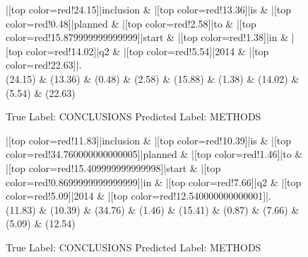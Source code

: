 \documentclass[a4paper, landscape]{article}
\begin{document}
\begin{figure}
\begin{center}
\begin{dependency}
\begin{deptext}
|[top color=red!24.15]|inclusion \& |[top color=red!13.36]|is \& |[top color=red!0.48]|planned \& |[top color=red!2.58]|to \& |[top color=red!15.879999999999999]|start \& |[top color=red!1.38]|in \& |[top color=red!14.02]|q2 \& |[top color=red!5.54]|2014 \& |[top color=red!22.63]|.\\
(24.15) \& (13.36) \& (0.48) \& (2.58) \& (15.88) \& (1.38) \& (14.02) \& (5.54) \& (22.63)\\
\end{deptext}
\end{dependency}
\end{center}
\caption{True Label: CONCLUSIONS Predicted Label: METHODS}
\end{figure}
\clearpage
\begin{figure}
\begin{center}
\begin{dependency}
\begin{deptext}
|[top color=red!11.83]|inclusion \& |[top color=red!10.39]|is \& |[top color=red!34.760000000000005]|planned \& |[top color=red!1.46]|to \& |[top color=red!15.409999999999998]|start \& |[top color=red!0.8699999999999999]|in \& |[top color=red!7.66]|q2 \& |[top color=red!5.09]|2014 \& |[top color=red!12.540000000000001]|.\\
(11.83) \& (10.39) \& (34.76) \& (1.46) \& (15.41) \& (0.87) \& (7.66) \& (5.09) \& (12.54)\\
\end{deptext}
\end{dependency}
\end{center}
\caption{True Label: CONCLUSIONS Predicted Label: METHODS}
\end{figure}
\clearpage
\end{document}

